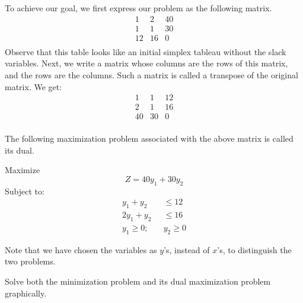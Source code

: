 \begin{solution}
    To achieve our goal, we first express our problem as the following matrix.
    \[
        \begin{array}{cc|c}
            1  & 2  & 40 \\
            1  & 1  & 30 \\
            \hline
            12 & 16 & 0  \\
        \end{array}
    \]
    Observe that this table looks like an initial simplex tableau without the slack variables. Next, we write a matrix whose columns are the rows of this matrix, and the rows are the columns. Such a matrix is called a transpose of the original matrix. We get:
    \[
        \begin{array}{cc|c}
            1  & 1  & 12 \\
            2  & 1  & 16 \\
            \hline
            40 & 30 & 0  \\
        \end{array}
    \]

    The following maximization problem associated with the above matrix is called its dual.

    Maximize
    \[ Z = 40y_1 + 30y_2 \]
    Subject to:
    \begin{align*}
        y_1 + y_2         & \leq 12    \\
        2y_1 + y_2        & \leq 16    \\
        y_1 \geq 0; \quad & y_2 \geq 0
    \end{align*}

    Note that we have chosen the variables as \( y \)'s, instead of \( x \)'s, to distinguish the two problems.
\end{solution}

\begin{example}\label{example_min_max_dual_graphically}
    Solve both the minimization problem and its dual maximization problem graphically.
\end{example}

